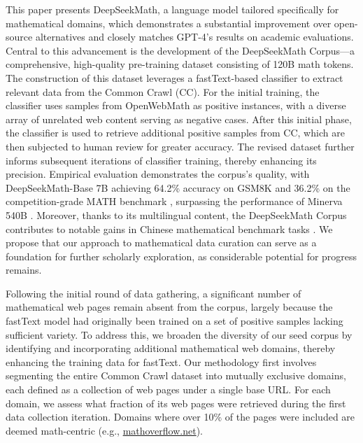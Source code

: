 \begin{itemize}[topsep=0pt]
This paper presents DeepSeekMath, a language model tailored specifically for mathematical domains, which demonstrates a substantial improvement over open-source alternatives and closely matches GPT-4’s results on academic evaluations. Central to this advancement is the development of the DeepSeekMath Corpus—a comprehensive, high-quality pre-training dataset consisting of 120B math tokens. The construction of this dataset leverages a fastText-based classifier \citep{joulin2016fasttext} to extract relevant data from the Common Crawl (CC). For the initial training, the classifier uses samples from OpenWebMath \citep{openwebmath} as positive instances, with a diverse array of unrelated web content serving as negative cases. After this initial phase, the classifier is used to retrieve additional positive samples from CC, which are then subjected to human review for greater accuracy. The revised dataset further informs subsequent iterations of classifier training, thereby enhancing its precision. Empirical evaluation demonstrates the corpus’s quality, with DeepSeekMath-Base 7B achieving 64.2\% accuracy on GSM8K \citep{gsm8k} and 36.2\% on the competition-grade MATH benchmark \citep{MATH}, surpassing the performance of Minerva 540B \citep{minerva}. Moreover, thanks to its multilingual content, the DeepSeekMath Corpus contributes to notable gains in Chinese mathematical benchmark tasks \citep{wei2023cmath,agieval}. We propose that our approach to mathematical data curation can serve as a foundation for further scholarly exploration, as considerable potential for progress remains.

Following the initial round of data gathering, a significant number of mathematical web pages remain absent from the corpus, largely because the fastText model had originally been trained on a set of positive samples lacking sufficient variety. To address this, we broaden the diversity of our seed corpus by identifying and incorporating additional mathematical web domains, thereby enhancing the training data for fastText. Our methodology first involves segmenting the entire Common Crawl dataset into mutually exclusive domains, each defined as a collection of web pages under a single base URL. For each domain, we assess what fraction of its web pages were retrieved during the first data collection iteration. Domains where over 10\% of the pages were included are deemed math-centric (e.g., \url{mathoverflow.net}). 


\end{itemize}
